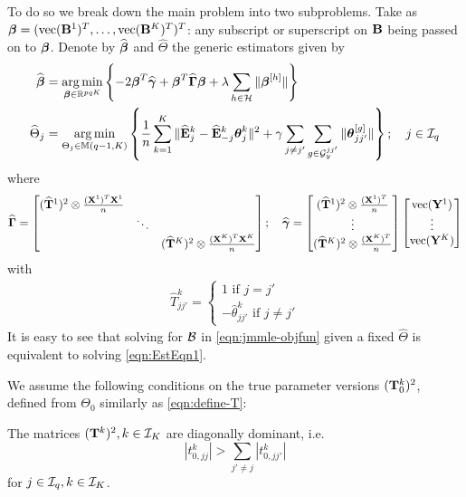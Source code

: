 To do so we break down the main problem into two subproblems. Take as ${\boldsymbol{\beta}} = (\operatorname*{vec} ({\mathbf{B}}^1)^T, \ldots, \operatorname*{vec}({\mathbf{B}}^K)^T)^T$: any subscript or superscript on ${\mathbf{B}}$ being passed on to ${\boldsymbol{\beta}}$. Denote by $\widehat {{\boldsymbol{\beta}}}$ and $\widehat \Theta$ the generic estimators given by
%
\begin{align}
\widehat {{\boldsymbol{\beta}}} &= \operatorname*{arg\,min}_{{\boldsymbol{\beta}} \in {\mathbb{R}}^{pqK}} \left\{-2 {\boldsymbol{\beta}}^T \widehat {{\boldsymbol{\gamma}}} + {\boldsymbol{\beta}}^T \widehat {{\boldsymbol{\Gamma}}} {\boldsymbol{\beta}} + \lambda \sum_{h \in {\cal{H}}} \| {\boldsymbol{\beta}}^{[h]}  \| \right\} \label{eqn:EstEqn1}\\
\widehat \Theta_j &= \operatorname*{arg\,min}_{\Theta_j \in {\mathbb{M}}(q-1, K)} \left\{ \frac{1}{n} \sum_{k=1}^K \| \widehat {{\mathbf{E}}}^k_j - \widehat {{\mathbf{E}}}^k_{-j} {\boldsymbol{\theta}}_j^k \|^2 + \gamma \sum_{j \neq j'} \sum_{g \in {\cal{G}}_y^{jj'}} \| {\boldsymbol{\theta}}_{jj'}^{[g]} \| \right\};
\quad j \in {\cal{I}}_q \label{eqn:EstEqn2}
\end{align}
%
where
%
$$
\widehat {{\boldsymbol{\Gamma}}} = \begin{bmatrix}
(\widehat {{\mathbf{T}}}^1)^2 \otimes \frac{({\mathbf{X}}^1)^T {\mathbf{X}}^1}{n} & &\\
& \ddots &\\
& & (\widehat {{\mathbf{T}}}^K)^2 \otimes \frac{({\mathbf{X}}^K)^T {\mathbf{X}}^K}{n}
\end{bmatrix}; \quad
\widehat {{\boldsymbol{\gamma}}} = \begin{bmatrix}
(\widehat {{\mathbf{T}}}^1)^2 \otimes \frac{({\mathbf{X}}^1)^T}{n}\\
\vdots\\
(\widehat {{\mathbf{T}}}^K)^2 \otimes \frac{({\mathbf{X}}^K)^T}{n}
\end{bmatrix}
\begin{bmatrix}
\operatorname*{vec} ({\mathbf{Y}}^1)\\
\vdots\\
\operatorname*{vec} ({\mathbf{Y}}^K)
\end{bmatrix}
$$
with 
%
\begin{align}\label{eqn:define-T}
\hat T_{jj'}^k = \begin{cases}
1 \text{ if } j = j'\\
- \hat \theta_{jj'}^k \text{ if } j \neq j'
\end{cases}
\end{align}
%
It is easy to see that solving for ${\cal{B}}$ in \eqref{eqn:jmmle-objfun} given a fixed $\widehat \Theta$ is equivalent to solving \eqref{eqn:EstEqn1}.

We assume the following conditions on the true parameter versions $({\mathbf{T}}_0^k)^2$, defined from $\Theta_0$ similarly as \eqref{eqn:define-T}:

\vspace{1em}
 The matrices $({\mathbf{T}}^k)^2, k \in {\cal{I}}_K$ are diagonally dominant, i.e. %
%
$$
|t_{0,jj}^k | > \sum_{j' \neq j} |t_{0,jj'}^k |
$$
%
for $j \in {\cal{I}}_q, k \in {\cal{I}}_K$.
\vspace{1em}
%

